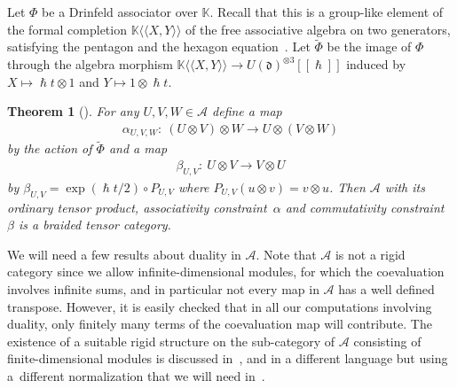 \documentclass[10pt,a4paper]{amsart}
\numberwithin{equation}{section}
\newcommand{\mf}[1]{\mathfrak{#1}}
\newcommand{\h}{\hslash}
\newcommand{\ot}{\otimes}
\newcommand{\cA}{\mathcal {A}}
\newcommand{\kk}{\mathbb K}
\newtheorem{thm}{Theorem}[section]
\theoremstyle{definition}
\begin{document}
Let $\Phi$ be a Drinfeld associator over $\kk$. Recall that this is a group-like element of the formal completion $\kk\langle\langle X,Y\rangle\rangle$ of the free associative algebra on two generators, satisfying the pentagon and the hexagon equation~\cite{Drinfeld1990a}. Let $\tilde\Phi$ be the image of $\Phi$ through the algebra morphism $\kk\langle\langle X,Y\rangle\rangle \rightarrow U(\mf d)^{\ot 3}[[\h]]$ induced by $X\mapsto \h t\ot 1$ and $Y\mapsto 1\ot \h t$.
	\begin{thm}[\cite{Drinfeld1990,Drinfeld1990a}]
For any $U,V,W \in \cA$ define a map
\begin{gather*}
	\alpha_{U,V,W}\colon \ (U\ot V)\ot W \rightarrow U\ot (V \ot W)
\end{gather*}
by the action of $\tilde \Phi$ and a map
\begin{gather*}
	\beta_{U,V}\colon \ U\ot V \rightarrow V \ot U
\end{gather*}
by $\beta_{U,V}=\exp(\h t/2)\circ P_{U,V}$ where $P_{U,V}(u\ot v)=v\ot u$. Then $\cA$ with its ordinary tensor product, associativity constraint~$\alpha$ and commutativity constraint $\beta$ is a braided tensor category.
\end{thm}

We will need a few results about duality in $\cA$. Note that $\cA$ is not a rigid category since we allow inf\/inite-dimensional modules, for which the coevaluation involves inf\/inite sums, and in particular not every map in $\cA$ has a well def\/ined transpose. However, it is easily checked that in all our computations involving duality, only f\/initely many terms of the coevaluation map will contribute. The existence of a suitable rigid structure on the sub-category of $\cA$ consisting of f\/inite-dimensional modules is discussed in~\cite{Cartier1993,Drinfeld1990,Kassel1998}, and in a dif\/ferent language but using a~dif\/ferent normalization that we will need in~\cite{Le1995,Le1997}.
\end{document}
